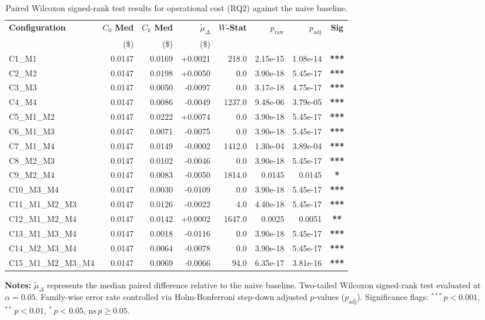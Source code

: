 \begin{table}[!htbp]
\centering
\small
\caption{Paired Wilcoxon signed-rank test results for operational cost (RQ2) against the naive baseline.}
\label{tab:wilcoxon_rq2}
\begin{tabular*}{\textwidth}{@{\extracolsep{\fill}} l r r r r r r c @{}}
\toprule
\textbf{Configuration} & \textbf{$C_0$ Med} & \textbf{$C_k$ Med} & \textbf{$\tilde{\mu}_\Delta$} & \textbf{$W$-Stat} & \textbf{$p_{\text{raw}}$} & \textbf{$p_{\text{adj}}$} & \textbf{Sig} \\
 & \scriptsize{(\$)} & \scriptsize{(\$)} & \scriptsize{(\$)} & & & & \\
\midrule
C1\_M1 & 0.0147 & 0.0169 & +0.0021 & 218.0 & 2.15e-15 & 1.08e-14 & \textbf{***} \\
C2\_M2 & 0.0147 & 0.0198 & +0.0050 & 0.0 & 3.90e-18 & 5.45e-17 & \textbf{***} \\
C3\_M3 & 0.0147 & 0.0050 & -0.0097 & 0.0 & 3.17e-18 & 4.75e-17 & \textbf{***} \\
C4\_M4 & 0.0147 & 0.0086 & -0.0049 & 1237.0 & 9.48e-06 & 3.79e-05 & \textbf{***} \\
C5\_M1\_M2 & 0.0147 & 0.0222 & +0.0074 & 0.0 & 3.90e-18 & 5.45e-17 & \textbf{***} \\
C6\_M1\_M3 & 0.0147 & 0.0071 & -0.0075 & 0.0 & 3.90e-18 & 5.45e-17 & \textbf{***} \\
C7\_M1\_M4 & 0.0147 & 0.0149 & -0.0002 & 1412.0 & 1.30e-04 & 3.89e-04 & \textbf{***} \\
C8\_M2\_M3 & 0.0147 & 0.0102 & -0.0046 & 0.0 & 3.90e-18 & 5.45e-17 & \textbf{***} \\
C9\_M2\_M4 & 0.0147 & 0.0083 & -0.0050 & 1814.0 & 0.0145 & 0.0145 & \textbf{*} \\
C10\_M3\_M4 & 0.0147 & 0.0030 & -0.0109 & 0.0 & 3.90e-18 & 5.45e-17 & \textbf{***} \\
C11\_M1\_M2\_M3 & 0.0147 & 0.0126 & -0.0022 & 4.0 & 4.40e-18 & 5.45e-17 & \textbf{***} \\
C12\_M1\_M2\_M4 & 0.0147 & 0.0142 & +0.0002 & 1647.0 & 0.0025 & 0.0051 & \textbf{**} \\
C13\_M1\_M3\_M4 & 0.0147 & 0.0018 & -0.0116 & 0.0 & 3.90e-18 & 5.45e-17 & \textbf{***} \\
C14\_M2\_M3\_M4 & 0.0147 & 0.0064 & -0.0078 & 0.0 & 3.90e-18 & 5.45e-17 & \textbf{***} \\
C15\_M1\_M2\_M3\_M4 & 0.0147 & 0.0069 & -0.0066 & 94.0 & 6.35e-17 & 3.81e-16 & \textbf{***} \\
\bottomrule
\end{tabular*}
\vspace{0.5em}
\parbox{\textwidth}{\footnotesize
\textbf{Notes:} $\tilde{\mu}_\Delta$ represents the median paired difference relative to the naive baseline. Two-tailed Wilcoxon signed-rank test evaluated at $\alpha = 0.05$. Family-wise error rate controlled via Holm-Bonferroni step-down adjusted $p$-values ($p_{\text{adj}}$). Significance flags: $^{***}\,p < 0.001$, $^{**}\,p < 0.01$, $^{*}\,p < 0.05$, $\text{ns}\,p \ge 0.05$.}
\end{table}

